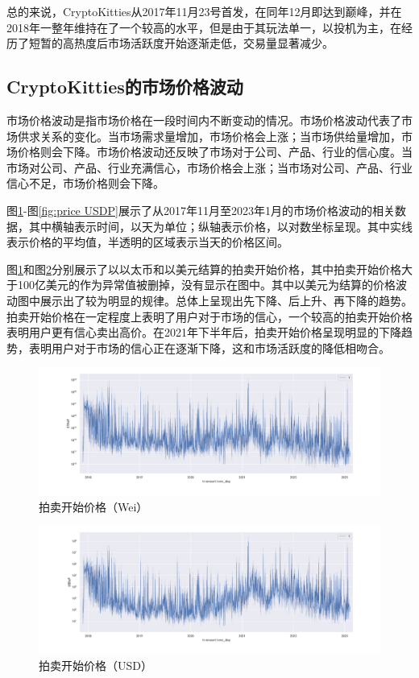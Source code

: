 \documentclass{myreport}
\begin{document}
总的来说，CryptoKitties从2017年11月23号首发，在同年12月即达到巅峰，并在2018年一整年维持在了一个较高的水平，但是由于其玩法单一，以投机为主，在经历了短暂的高热度后市场活跃度开始逐渐走低，交易量显著减少。

\subsection{CryptoKitties的市场价格波动}
市场价格波动是指市场价格在一段时间内不断变动的情况。市场价格波动代表了市场供求关系的变化。当市场需求量增加，市场价格会上涨；当市场供给量增加，市场价格则会下降。市场价格波动还反映了市场对于公司、产品、行业的信心度。当市场对公司、产品、行业充满信心，市场价格会上涨；当市场对公司、产品、行业信心不足，市场价格则会下降。

图\ref{fig:price ETHsP}-图\ref{fig:price USDP}展示了从2017年11月至2023年1月的市场价格波动的相关数据，其中横轴表示时间，以天为单位；纵轴表示价格，以对数坐标呈现。其中实线表示价格的平均值，半透明的区域表示当天的价格区间。

图\ref{fig:price ETHsP}和图\ref{fig:price USDsP}分别展示了以以太币和以美元结算的拍卖开始价格，其中拍卖开始价格大于100亿美元的作为异常值被删掉，没有显示在图中。其中以美元为结算的价格波动图中展示出了较为明显的规律。总体上呈现出先下降、后上升、再下降的趋势。拍卖开始价格在一定程度上表明了用户对于市场的信心，一个较高的拍卖开始价格表明用户更有信心卖出高价。在2021年下半年后，拍卖开始价格呈现明显的下降趋势，表明用户对于市场的信心正在逐渐下降，这和市场活跃度的降低相吻合。


\begin{figure}[!htbp]
	\centering
	\includegraphics[width=\linewidth]{figure/price ETHsP.pdf}
	\caption{拍卖开始价格（Wei）}
	\label{fig:price ETHsP}
\end{figure}
\begin{figure}[!htbp]
	\centering
	\includegraphics[width=\linewidth]{figure/price USDsP.pdf}
	\caption{拍卖开始价格（USD）}
	\label{fig:price USDsP}
\end{figure}
\end{document}
